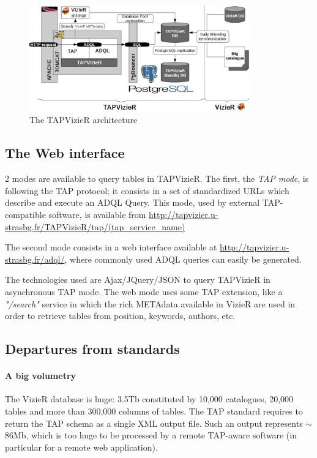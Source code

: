 \begin{figure}[hbp] \center
\includegraphics[width=0.85\textwidth]{part8/Landais_P44/P044_fig1.eps}
\caption{The TAPVizieR architecture}\label{P044:architecture}
\end{figure}

\subsection{The Web interface}
\label{P044:web_interface}
2 modes are available to query tables in TAPVizieR.
The first, the {\em TAP mode}, is
following the TAP protocol; it consists in a set of standardized URLs
which
describe and execute an ADQL Query. This mode, used by external TAP-compatible
software, is available from
{\small\url{http://tapvizier.u-strasbg.fr/TAPVizieR/tap/(tap_service_name)}}

The second mode consists in a web interface  
available at {\small\url{http://tapvizier.u-strasbg.fr/adql/}}, where
commonly used ADQL queries can easily be generated.

The technologies used are Ajax/JQuery/JSON to query TAPVizieR in asynchronous 
TAP mode. The web mode uses some TAP extension, like a \textit{"/search"} service
in which the rich METAdata available in VizieR are used in order to retrieve tables 
from position, keywords, authors, etc.


\subsection{Departures from standards}

\paragraph{A big volumetry}

The VizieR database is huge:  3.5Tb constituted by 10,000 catalogues, 20,000
tables and more than 300,000 columns of tables. The TAP standard requires
to return the TAP schema as a single XML output file. Such an output represents
$\sim$86Mb, which is too huge to be processed by a remote TAP-aware
software (in 
particular for a remote web application).

